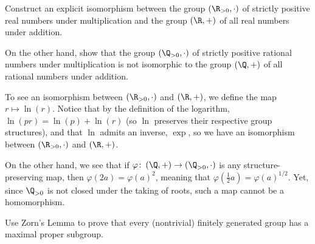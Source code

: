 \documentclass[10pt]{mypackage}
\begin{document}
\begin{problem}[Problem 8]
  Construct an explicit isomorphism between the group $\left( \R_{> 0},\cdot \right)$ of strictly positive real numbers under multiplication and the group $\left( \R,+ \right)$ of all real numbers under addition.\newline

  On the other hand, show that the group $\left( \Q_{ > 0 },\cdot \right)$ of strictly positive rational numbers under multiplication is not isomorphic to the group $\left( \Q,+ \right)$ of all rational numbers under addition.
\end{problem}
\begin{solution}
  To see an isomorphism between $\left( \R_{ > 0 },\cdot \right)$ and $\left( \R,+ \right)$, we define the map $r\mapsto \ln\left( r \right)$. Notice that by the definition of the logarithm, $\ln\left( pr \right) = \ln\left( p \right) + \ln\left( r \right)$ (so $\ln$ preserves their respective group structures), and that $\ln$ admits an inverse, $\exp$, so we have an isomorphism between $\left( \R_{ > 0 },\cdot \right)$ and $\left( \R,+ \right)$.\newline

  On the other hand, we see that if $\varphi\colon \left( \Q,+ \right)\rightarrow \left( \Q_{> 0},\cdot \right)$ is any structure-preserving map, then $\varphi\left( 2a \right) = \varphi\left( a \right)^2$, meaning that $\varphi\left( \frac{1}{2}a \right) = \varphi\left( a \right)^{1/2}$. Yet, since $\Q_{> 0}$ is not closed under the taking of roots, such a map cannot be a homomorphism.
\end{solution}
\begin{problem}[Problem 9]
  Use Zorn's Lemma to prove that every (nontrivial) finitely generated group has a maximal proper subgroup.
\end{problem}
\end{document}
